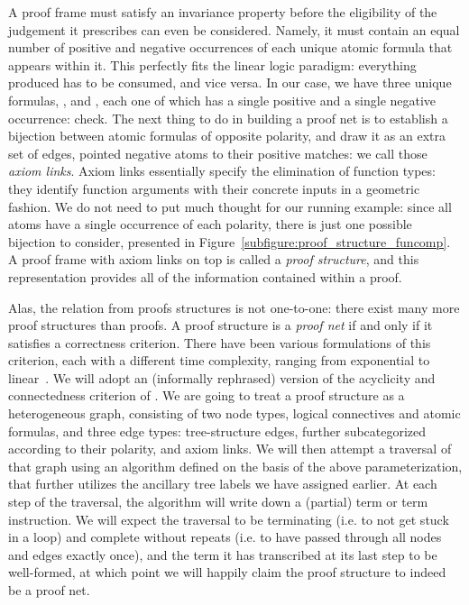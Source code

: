 A proof frame must satisfy an invariance property before the eligibility of the judgement it prescribes can even be considered.
Namely, it must contain an equal number of positive and negative occurrences of each unique atomic formula that appears within it.
This perfectly fits the linear logic paradigm: everything produced has to be consumed, and vice versa.
In our case, we have three unique formulas, ,  and , each one of which has a single positive and a single negative occurrence: check.
The next thing to do in building a proof net is to establish a bijection between atomic formulas of opposite polarity, and draw it as an extra set of edges, pointed negative atoms to their positive matches: we call those \textit{axiom links}.
Axiom links essentially specify the elimination of function types: they identify function arguments with their concrete inputs in a geometric fashion.
We do not need to put much thought for our running example: since all atoms have a single occurrence of each polarity, there is just one possible bijection to consider, presented in Figure~\ref{subfigure:proof_structure_funcomp}.
A proof frame with axiom links on top is called a \textit{proof structure}, and this representation provides all of the information contained within a proof.

Alas, the relation from proofs structures is not one-to-one: there exist many more proof structures than proofs.
A proof structure is a \textit{proof net} if and only if it satisfies a correctness criterion.
There have been various formulations of this criterion, each with a different time complexity, ranging from exponential to linear~\cite{girard1987linear,danos1989structure,murawski2000dominator,guerrini2011linear}.
We will adopt an (informally rephrased) version of the acyclicity and connectedness criterion of \citet{danos1989structure}.
We are going to treat a proof structure as a heterogeneous graph, consisting of two node types, logical connectives and atomic formulas, and three edge types: tree-structure edges, further subcategorized according to their polarity, and axiom links.
We will then attempt a traversal of that graph using an algorithm defined on the basis of the above parameterization, that further utilizes the  ancillary tree labels we have assigned earlier.
At each step of the traversal, the algorithm will write down a (partial) term or term instruction.
We will expect the traversal to be terminating (i.e. to not get stuck in a loop) and complete without repeats (i.e. to have passed through all nodes and edges exactly once), and the term it has transcribed at its last step to be well-formed, at which point we will happily claim the proof structure to indeed be a proof net.

